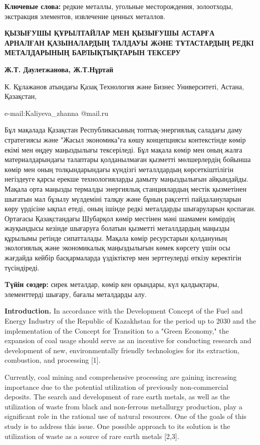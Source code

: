 {\bfseries Ключевые слова:} редкие металлы, угольные месторождения,
золоотходы, экстракция элементов, извлечение ценных металлов.

{\bfseries ҚЫЗЫҒУШЫ ҚҰРЫЛТАЙЛАР МЕН ҚЫЗЫҒУШЫ АСТАРҒА АРНАЛҒАН ҚАЗЫНАЛАРДЫҢ
ТАЛДАУЫ ЖӘНЕ ТҰТАСТАРДЫҢ РЕДКІ МЕТАЛДАРЫНЫҢ БАРЛЫҚТЫҚТАРЫН ТЕКСЕРУ}

{\bfseries Ж.Т. Даулетжанова, Ж.Т.Нұртай}

К. Құлажанов атындағы Қазақ Технология және Бизнес Университеті, Астана,
Қазақстан,

e-mail:Kaliyeva\_zhanna @mail.ru

Бұл мақалада Қазақстан Республикасының топтық-энергиялық саладағы даму
стратегиясы және "Жасыл экономика"ға көшу концепциясы контекстінде көмір
екімі мен өңдеу маңыздылығы тексеріледі. Бұл мақала көмір мен оның жалға
материалдарындағы талаптары қолданылмаған қызметті мөлшерлердің бойынша
көмір мен оның толқындарындағы күндізгі металлдардың көрсеткіштілігін
негіздеуге қарсы ерекше технологияларды дамыту маңыздылығын айқындайды.
Мақала орта маңызды термалды энергиялық станциялардың местік қызметінен
шығатын мал бұзылу мүлдеміні талқау және бұның рақсетті пайдалануларын
көру үрдісіне ықпал етеді, оның ішінде редкі металдарды шығаруларын
қоспаған. Ортағасы Қазақстандағы Шубарқол көмір местінен мәні шамамен
көмірдің жауқындысы кезінде шығаруға болатын қызметті металлдардың
маңызды құрылымы ретінде сипатталады. Мақала көмір ресурстарын
қолдануның экологиялық және экономикалық маңыздылығын көмек көрсету үшін
осы жағдайда кейбір басқармаларда үздіктіктер мен зерттеулерді өткізу
керектігін түсіндіреді.

{\bfseries Tүйін сөздер:} сирек металдар, көмір кен орындары, күл
қалдықтары, элементтерді шығару, бағалы металдарды алу.

{\bfseries Introduction.} In accordance with the Development Concept of the
Fuel and Energy Industry of the Republic of Kazakhstan for the period up
to 2030 and the implementation of the Concept for Transition to a "Green
Economy," the expansion of coal usage should serve as an incentive for
conducting research and development of new, environmentally friendly
technologies for its extraction, combustion, and processing {[}1{]}.

Currently, coal mining and comprehensive processing are gaining
increasing importance due to the potential utilization of previously
non-commercial deposits. The search and development of rare earth
metals, as well as the utilization of waste from black and non-ferrous
metallurgy production, play a significant role in the rational use of
natural resources. One of the goals of this study is to address this
issue. One possible approach to its solution is the utilization of waste
as a source of rare earth metals {[}2,3{]}.

